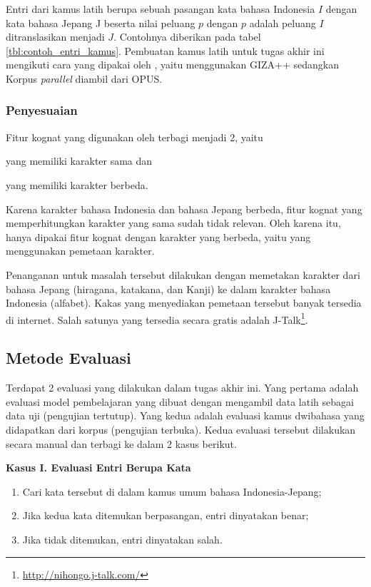 \documentclass[../main/main.tex]{subfiles}
\begin{document}
Entri dari kamus latih berupa sebuah pasangan kata bahasa Indonesia $I$ dengan kata bahasa Jepang J beserta nilai peluang $p$ dengan $p$ adalah peluang $I$ ditranslasikan menjadi $J$. Contohnya diberikan pada tabel \ref{tbl:contoh_entri_kamus}. Pembuatan kamus latih untuk tugas akhir ini mengikuti cara yang dipakai oleh \textcite{aker}, yaitu menggunakan GIZA++ sedangkan Korpus \textit{parallel} diambil dari OPUS.

\subsubsection{Penyesuaian}
Fitur kognat yang digunakan oleh \textcite{aker} terbagi menjadi 2, yaitu
\begin{inparaenum}[(1)]
\item yang memiliki karakter sama dan
\item yang memiliki karakter berbeda.
\end{inparaenum}
Karena karakter bahasa Indonesia dan bahasa Jepang berbeda, fitur kognat yang memperhitungkan karakter yang sama sudah tidak relevan. Oleh karena itu, hanya dipakai fitur kognat dengan karakter yang berbeda, yaitu yang menggunakan pemetaan karakter.

Penanganan untuk masalah tersebut dilakukan dengan memetakan karakter dari bahasa Jepang (hiragana, katakana, dan Kanji) ke dalam karakter bahasa Indonesia (alfabet). Kakas yang menyediakan pemetaan tersebut banyak tersedia di internet. Salah satunya yang tersedia secara gratis adalah J-Talk\footnote{\url{http://nihongo.j-talk.com/}}.

\subsection{Metode Evaluasi}
Terdapat 2 evaluasi yang dilakukan dalam tugas akhir ini. Yang pertama adalah evaluasi model pembelajaran yang dibuat dengan mengambil data latih sebagai data uji (pengujian tertutup). Yang kedua adalah evaluasi kamus dwibahasa yang didapatkan dari korpus (pengujian terbuka). Kedua evaluasi tersebut dilakukan secara manual dan terbagi ke dalam 2 kasus berikut.

\textbf{Kasus I. Evaluasi Entri Berupa Kata}
\begin{enumerate}
\item Cari kata tersebut di dalam kamus umum bahasa Indonesia-Jepang;
\item Jika kedua kata ditemukan berpasangan, entri dinyatakan benar;
\item Jika tidak ditemukan, entri dinyatakan salah.
\end{enumerate}
\end{document}
